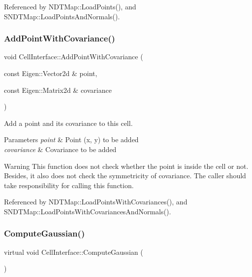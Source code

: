 Referenced by N\+D\+T\+Map\+::\+Load\+Points(), and S\+N\+D\+T\+Map\+::\+Load\+Points\+And\+Normals().

\mbox{\label{classCellInterface_a8db8c78e18327c3427ce8981f520eb6b}} 
\subsubsection{\texorpdfstring{Add\+Point\+With\+Covariance()}{AddPointWithCovariance()}}
{\footnotesize\ttfamily void Cell\+Interface\+::\+Add\+Point\+With\+Covariance (\begin{DoxyParamCaption}\item[{const Eigen\+::\+Vector2d \&}]{point,  }\item[{const Eigen\+::\+Matrix2d \&}]{covariance }\end{DoxyParamCaption})\hspace{0.3cm}{\ttfamily [inline]}}



Add a point and its covariance to this cell. 


\begin{DoxyParams}{Parameters}
{\em point} & Point (x, y) to be added \\
\hline
{\em covariance} & Covariance to be added \\
\hline
\end{DoxyParams}
\begin{DoxyWarning}{Warning}
This function does not check whether the point is inside the cell or not. Besides, it also does not check the symmetricity of covariance. The caller should take responsibility for calling this function. 
\end{DoxyWarning}


Referenced by N\+D\+T\+Map\+::\+Load\+Points\+With\+Covariances(), and S\+N\+D\+T\+Map\+::\+Load\+Points\+With\+Covariances\+And\+Normals().

\mbox{\label{classCellInterface_a77bb8db9ba84ecb98622b18d70854090}} 
\subsubsection{\texorpdfstring{Compute\+Gaussian()}{ComputeGaussian()}}
{\footnotesize\ttfamily virtual void Cell\+Interface\+::\+Compute\+Gaussian (\begin{DoxyParamCaption}{ }\end{DoxyParamCaption})\hspace{0.3cm}{\ttfamily [pure virtual]}}



